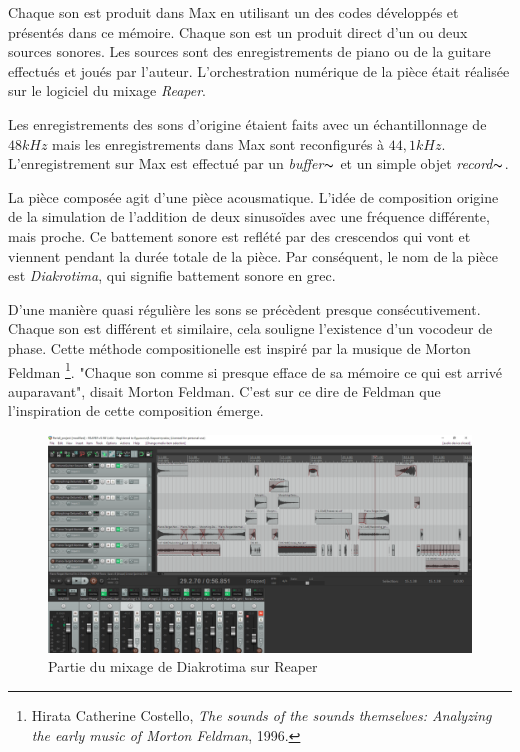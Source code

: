 Chaque son est produit dans Max en utilisant un des codes développés et présentés dans ce mémoire. Chaque son est un produit direct d'un ou deux sources sonores. Les sources sont des enregistrements de piano ou de la guitare effectués et joués par l'auteur. L'orchestration numérique de la pièce était réalisée sur le logiciel du mixage \textit{Reaper}. 

Les enregistrements des sons d'origine étaient faits avec un échantillonnage de $48kHz$ mais les enregistrements dans Max sont reconfigurés à $44,1kHz$. L'enregistrement sur Max est effectué par un \textit{buffer$\thicksim$} et un simple objet \textit{record$\thicksim$}. 

La pièce composée agit d'une pièce acousmatique. L'idée de composition origine de la simulation de l'addition de deux sinusoïdes avec une fréquence différente, mais proche. Ce battement sonore est reflété par des crescendos qui vont et viennent pendant la durée totale de la pièce. Par conséquent, le nom de la pièce est \textit{Diakrotima}, qui signifie battement sonore en grec.

D'une manière quasi régulière les sons se précèdent presque consécutivement. Chaque son est différent et similaire, cela souligne l'existence d'un vocodeur de phase. Cette méthode compositionelle est inspiré par la musique de Morton Feldman \footnote{Hirata Catherine Costello, \textit{The sounds of the sounds themselves: Analyzing the early music of Morton Feldman}, 1996. \nocite{hirata1996sounds}}. "Chaque son comme si presque efface de sa mémoire ce qui est arrivé auparavant", disait Morton Feldman. C'est sur ce dire de Feldman que l'inspiration de cette composition émerge.

    \begin{figure}
        \centering
        \includegraphics[width = \textwidth ]{Graphs/Reaper_capture_project.png}
        \caption{Partie du mixage de Diakrotima sur Reaper}
        \label{Reaper_capture}
    \end{figure} 

